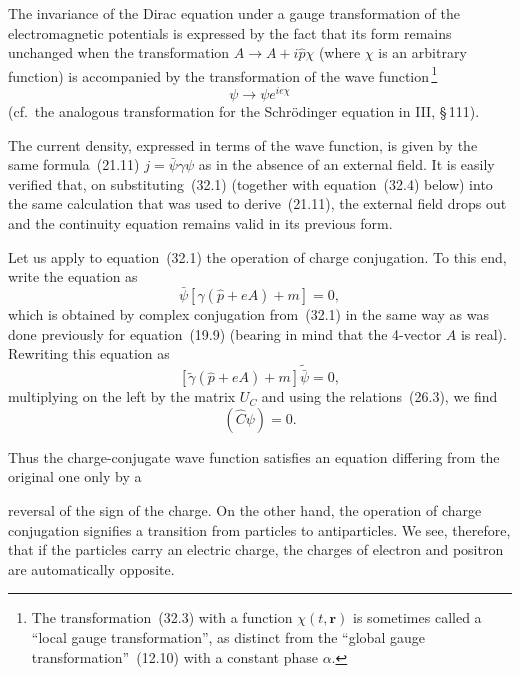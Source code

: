 The invariance of the Dirac equation under a gauge transformation of the electromagnetic potentials is expressed by the fact that its form remains unchanged when the transformation $A \to A + i\widehat p\chi$ (where $\chi$ is an arbitrary function) is accompanied by the transformation of the wave function\,\footnote{The transformation~(32.3) with a function $\chi(t,\mathbf{r})$ is sometimes called a ``local gauge transformation'', as distinct from the ``global gauge transformation''~(12.10) with a constant phase $\alpha$.}
\begin{equation}
\psi \to \psi e^{ie\chi}
\tag{32.3}
\end{equation}
(cf.\ the analogous transformation for the Schr\"odinger equation in III, \S\,111).

The current density, expressed in terms of the wave function, is given by the same formula~(21.11) $j = \bar\psi\gamma\psi$ as in the absence of an external field. It is easily verified that, on substituting~(32.1) (together with equation~(32.4) below) into the same calculation that was used to derive~(21.11), the external field drops out and the continuity equation remains valid in its previous form.

Let us apply to equation~(32.1) the operation of charge conjugation. To this end, write the equation as
\begin{equation}
\bar\psi[\gamma(\widehat p + eA) + m] = 0,
\tag{32.4}
\end{equation}
which is obtained by complex conjugation from~(32.1) in the same way as was done previously for equation~(19.9) (bearing in mind that the 4-vector $A$ is real). Rewriting this equation as
\[
[\widetilde\gamma(\widehat p + eA) + m]\widetilde{\bar\psi} = 0,
\]
multiplying on the left by the matrix $U_C$ and using the relations~(26.3), we find
\begin{equation}
[\gamma(\widehat p + eA) - m](\widehat C\psi) = 0.
\tag{32.5}
\end{equation}

Thus the charge-conjugate wave function satisfies an equation differing from the original one only by a

reversal of the sign of the charge. On the other hand, the operation of charge conjugation signifies a transition from particles to antiparticles. We see, therefore, that if the particles carry an electric charge, the charges of electron and positron are automatically opposite.

